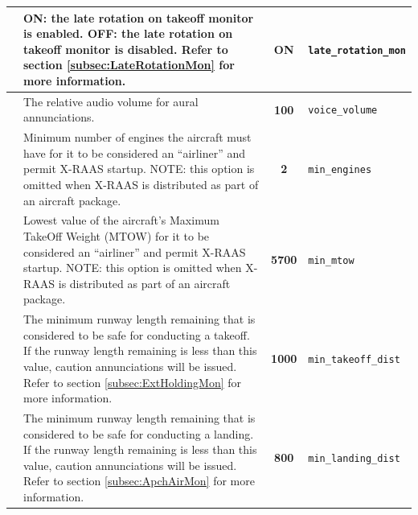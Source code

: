 \documentclass[a4paper,12pt]{article}
\newcommand{\confopt}[1]{\texttt{#1}}
\begin{document}
{\begin{center}
\begin{supertabular}{|c|p{8cm}|c|l|}
 &
\textbf{ON:} the late rotation on takeoff monitor is enabled.\newline
\textbf{OFF:} the late rotation on takeoff monitor is disabled.\newline
Refer to section \ref{subsec:LateRotationMon} for more information. &
\textbf{ON} & \confopt{late\_rotation\_mon} \\

\hline

 & The relative audio volume for aural annunciations. &
\textbf{100} & \confopt{voice\_volume} \\

\hline

 &
Minimum number of engines the aircraft must have for it to be considered
an ``airliner'' and permit X-RAAS startup.\newline
NOTE: this option is omitted when X-RAAS is distributed as part of an
aircraft package. &
\textbf{2} &
\confopt{min\_engines} \\

\hline

 &
Lowest value of the aircraft's Maximum TakeOff Weight (MTOW) for it to be
considered an ``airliner'' and permit X-RAAS startup.\newline
NOTE: this option is omitted when X-RAAS is distributed as part of an
aircraft package. &
\textbf{5700} & \confopt{min\_mtow} \\

\hline

 &
The minimum runway length remaining that is considered to be safe for
conducting a takeoff. If the runway length remaining is less than this
value, caution annunciations will be issued.\newline
Refer to section \ref{subsec:ExtHoldingMon} for more information. &
\textbf{1000} & \confopt{min\_takeoff\_dist} \\

\hline

 &
The minimum runway length remaining that is considered to be safe for
conducting a landing. If the runway length remaining is less than this
value, caution annunciations will be issued.\newline
Refer to section \ref{subsec:ApchAirMon} for more information. &
\textbf{800} & \confopt{min\_landing\_dist} \\

\hline


\end{supertabular}
\end{center}}
\end{document}
